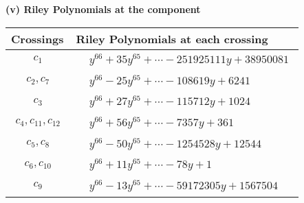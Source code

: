 \documentclass[1p]{elsarticle_modified}
\theoremstyle{definition}
\begin{document}
\flushleft \textbf{(v) Riley Polynomials at the component}\newline \\
\begin{tabular}{m{50pt}|m{274pt}}
Crossings & \hspace{64pt}Riley Polynomials at each crossing \\
\hline $$\begin{aligned}c_{1}\end{aligned}$$&$\begin{aligned}
&y^{66}+35 y^{65}+\cdots-251925111 y+38950081
\end{aligned}$\\
\hline $$\begin{aligned}c_{2},c_{7}\end{aligned}$$&$\begin{aligned}
&y^{66}-25 y^{65}+\cdots-108619 y+6241
\end{aligned}$\\
\hline $$\begin{aligned}c_{3}\end{aligned}$$&$\begin{aligned}
&y^{66}+27 y^{65}+\cdots-115712 y+1024
\end{aligned}$\\
\hline $$\begin{aligned}c_{4},c_{11},c_{12}\end{aligned}$$&$\begin{aligned}
&y^{66}+56 y^{65}+\cdots-7357 y+361
\end{aligned}$\\
\hline $$\begin{aligned}c_{5},c_{8}\end{aligned}$$&$\begin{aligned}
&y^{66}-50 y^{65}+\cdots-1254528 y+12544
\end{aligned}$\\
\hline $$\begin{aligned}c_{6},c_{10}\end{aligned}$$&$\begin{aligned}
&y^{66}+11 y^{65}+\cdots-78 y+1
\end{aligned}$\\
\hline $$\begin{aligned}c_{9}\end{aligned}$$&$\begin{aligned}
&y^{66}-13 y^{65}+\cdots-59172305 y+1567504
\end{aligned}$\\
\hline
\end{tabular}\\~\\
\end{document}
